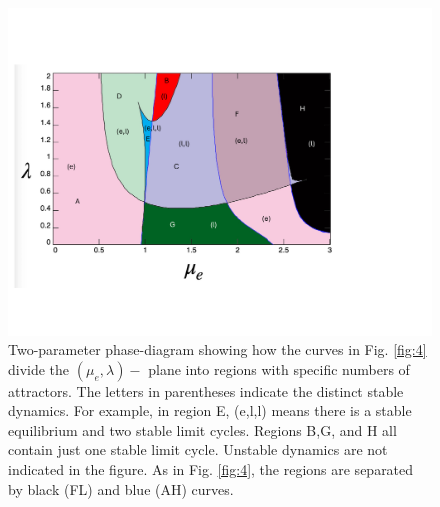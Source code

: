 \documentclass[10pt,letterpaper]{article}
\begin{document}
\begin{figure}
\includegraphics[width=.9\textwidth]{afig6.pdf}
\caption{Two-parameter phase-diagram showing how the curves in Fig. \ref{fig:4} divide the $(\mu_e,\lambda)-$ plane into regions with specific numbers of attractors. The letters in parentheses indicate the distinct stable dynamics. For example, in region E, (e,l,l) means there is a stable equilibrium and two stable limit cycles. Regions B,G, and H all contain just one stable limit cycle. Unstable dynamics are not indicated in the figure. As in Fig. \ref{fig:4}, the regions are separated by black (FL) and blue (AH) curves.  }
\label{fig:5}
\end{figure}
\end{document}
